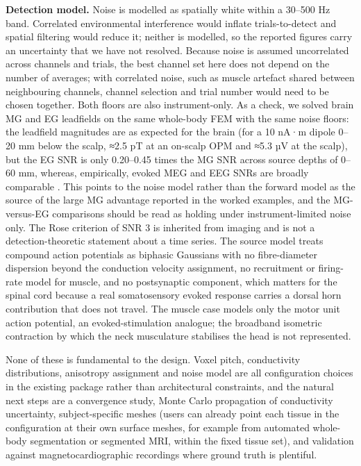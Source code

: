 \documentclass[11pt]{article}
\newcommand{\revised}[1]{#1}
\begin{document}
\textbf{Detection model.} Noise is modelled as spatially white within a
30--500 Hz band. Correlated environmental interference would inflate
trials-to-detect and spatial filtering would reduce it; neither is
modelled, so the reported figures carry an uncertainty that we have not
resolved. Because noise is assumed uncorrelated across channels and
trials, the best channel set here does not depend on the number of
averages; with correlated noise, such as muscle artefact shared between
neighbouring channels, channel selection and trial number would need to
be chosen together. Both floors are also instrument-only. As a check, we solved
brain MG and EG leadfields on the same whole-body FEM with the same
noise floors: the leadfield magnitudes are as expected for the brain
(for a 10 nA·m dipole 0--20 mm below the scalp, \revised{≈2.5 pT} at an on-scalp
OPM and \revised{≈5.3 µV} at the scalp), but the EG SNR is only \revised{0.20--0.45} times
the MG SNR across source depths of 0--60 mm, whereas, empirically, evoked
MEG and EEG SNRs are broadly comparable \citep{Goldenholz2009}. This
points to the noise model rather than the forward model as the source of
the large MG advantage reported in the worked examples, and the
MG-versus-EG comparisons should be read as holding under
instrument-limited noise only. The Rose criterion of SNR 3 is inherited
from imaging and is not a detection-theoretic statement about a time
series. The source model treats compound action potentials as biphasic
Gaussians with no fibre-diameter dispersion beyond the conduction
velocity assignment, no recruitment or firing-rate model for muscle, and
no postsynaptic component, which matters for the spinal cord because a
real somatosensory evoked response carries a dorsal horn contribution
that does not travel. The muscle case models only the motor unit action
potential, an evoked-stimulation analogue; the broadband isometric
contraction by which the neck musculature stabilises the head is not
represented.

None of these is fundamental to the design. Voxel pitch, conductivity
distributions, anisotropy assignment and noise model are all
configuration choices in the existing package rather than architectural
constraints, and the natural next steps are a convergence study, Monte
Carlo propagation of conductivity uncertainty, subject-specific meshes
(users can already point each tissue in the configuration at their own
surface meshes, for example from automated whole-body segmentation or
segmented MRI, within the fixed tissue set), and validation against
magnetocardiographic recordings where ground truth is plentiful.
\end{document}
